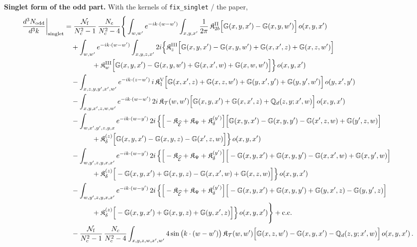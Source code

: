 \documentclass[10pt]{article}
\def\mf#1{\mathbb{#1}}
\begin{document}
\noindent\textbf{Singlet form of the odd part.} With the kernels of \texttt{fix\_singlet} / the paper,
\begin{align}
\frac{d^{3}N_{\rm odd}}{d^{3}k}\bigg|_{\rm singlet}&=\frac{\mathcal{N}_{\rm f}}{N_{c}^{2}-1}\,\frac{N_{c}}{N_{c}^{2}-4}\Bigg\{\int_{w,w'}e^{-ik\cdot(w-w')}\int_{x,y,x'}\frac{1}{2\pi}\,\mathfrak{K}^{\rm II}_{2b}\Big[\mf{G}(x,y,x')-\mf{G}(x,y,w')\Big]\,o(x,y,x')\notag\\
&\quad+\int_{w,w'}e^{-ik\cdot(w-w')}\int_{x,y,z,x'}2i\Big\{\mathfrak{K}^{\rm III}_{z}\Big[\mf{G}(x,y,x')-\mf{G}(x,y,w')+\mf{G}(x,x',z)+\mf{G}(x,z,w')\Big]\notag\\
&\qquad\qquad+\mathfrak{K}^{\rm III}_{w}\Big[\mf{G}(x,y,x')-\mf{G}(x,y,w')+\mf{G}(x,x',w)+\mf{G}(x,w,w')\Big]\Big\}\,o(x,y,x')\notag\\
&\quad-\int_{x,z,y,y',x',w'}e^{-ik\cdot(z-w')}\,i\,\mathfrak{K}^{\rm V}_{1}\Big[\mf{G}(x,x',z)+\mf{G}(x,z,w')+\mf{G}(y,x',y')+\mf{G}(y,y',w')\Big]\,o(y,x',y')\notag\\
&\quad-\int_{x,y,x',z,w,w'}e^{-ik\cdot(w-w')}\,2i\,\mathfrak{K}_{\mathcal{T}}(w,w')\Big[\mf{G}(x,y,x')+\mf{G}(x,x',z)+\mf{Q}_{d}(z,y;x',w)\Big]\,o(x,y,x')\notag\\
&\quad-\int_{w,x',y',z,y,x}e^{-ik\cdot(w-y')}\,2i\,\Big\{\Big[-\mathfrak{K}_{\widehat{\mathcal{E}}}+\mathfrak{K}_{\Psi}+\mathfrak{K}^{(y')}_{\delta}\Big]\Big[\mf{G}(x,y,x')-\mf{G}(x,y,y')-\mf{G}(x',z,w)+\mf{G}(y',z,w)\Big]\notag\\
&\qquad\qquad+\mathfrak{K}^{(z)}_{\delta}\Big[\mf{G}(x,y,x')-\mf{G}(x,y,z)-\mf{G}(x',z,w)\Big]\Big\}\,o(x,y,x')\notag\\
&\quad-\int_{w,y',z,y,x,x'}e^{-ik\cdot(w-y')}\,2i\,\Big\{\Big[-\mathfrak{K}_{\widehat{\mathcal{E}}}+\mathfrak{K}_{\Psi}+\mathfrak{K}^{(y')}_{\delta}\Big]\Big[-\mf{G}(x,y,x')+\mf{G}(x,y,y')-\mf{G}(x,x',w)+\mf{G}(x,y',w)\Big]\notag\\
&\qquad\qquad+\mathfrak{K}^{(z)}_{\delta}\Big[-\mf{G}(x,y,x')+\mf{G}(x,y,z)-\mf{G}(x,x',w)+\mf{G}(x,z,w)\Big]\Big\}\,o(x,y,x')\notag\\
&\quad-\int_{w,y',z,y,x,x'}e^{-ik\cdot(w-y')}\,2i\,\Big\{\Big[-\mathfrak{K}_{\widehat{\mathcal{E}}}+\mathfrak{K}_{\Psi}+\mathfrak{K}^{(y')}_{\delta}\Big]\Big[-\mf{G}(x,y,x')+\mf{G}(x,y,y')+\mf{G}(y,x',z)-\mf{G}(y,y',z)\Big]\notag\\
&\qquad\qquad+\mathfrak{K}^{(z)}_{\delta}\Big[-\mf{G}(x,y,x')+\mf{G}(x,y,z)+\mf{G}(y,x',z)\Big]\Big\}\,o(x,y,x')\Bigg\}+{\rm c.c.}\notag\\
&\quad-\frac{\mathcal{N}_{\rm f}}{N_{c}^{2}-1}\,\frac{N_{c}}{N_{c}^{2}-4}\int_{x,y,z,w,x',w'}4\sin\big(k\cdot(w-w')\big)\,\mathfrak{K}_{\mathcal{T}}(w,w')\Big[\mf{G}(x,z,w')-\mf{G}(x,y,x')-\mf{Q}_{d}(z,y;x',w)\Big]\,o(x,y,x')\,.\label{eq:dabc-odd}
\end{align}
\end{document}
